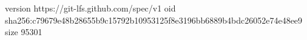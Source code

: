 version https://git-lfs.github.com/spec/v1
oid sha256:c79679e48b28655b9c15792b10953125f8e3196bb6889b4bdc26052e74e48ee9
size 95301
